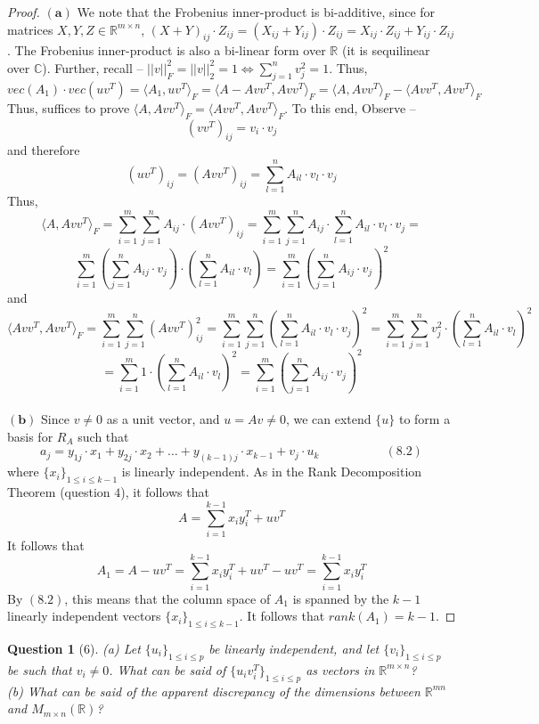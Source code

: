\documentclass[11pt]{article}
\theoremstyle{quest}
\newtheorem*{question}{Question}
\begin{document}
\begin{proof}
$\mathbf{(a)}$ We note that the Frobenius inner-product is bi-additive, since for matrices $X, Y, Z \in \mathbb{R}^{m \times n}$, $(X+Y)_{ij} \cdot Z_{ij} = (X_{ij} + Y_{ij}) \cdot Z_{ij} = X_{ij} \cdot Z_{ij} + Y_{ij} \cdot Z_{ij}$. The Frobenius inner-product is also a bi-linear form over $\mathbb{R}$ (it is sequilinear over $\mathbb{C}$). Further, recall -- $||v||_F^2 = ||v||_2^2 = 1 \iff \sum_{j=1}^n v_j^2 = 1$. Thus,
$$vec(A_1) \cdot vec(uv^T) = \langle A_1, uv^T \rangle_F = \langle A - Avv^T, Avv^T \rangle_F = \langle A, Avv^T \rangle_F - \langle Avv^T, Avv^T \rangle_F$$
Thus, suffices to prove $ \langle A, Avv^T \rangle_F = \langle Avv^T, Avv^T \rangle_F$. To this end, Observe --
$$(vv^T)_{ij} = v_i \cdot v_j$$
and therefore
$$(uv^T)_{ij} = (Avv^T)_{ij} = \sum_{l=1}^n A_{il} \cdot v_l \cdot v_j$$
Thus,
$$\langle A, Avv^T \rangle_F = \sum_{i =1}^m \sum_{j=1}^n A_{ij} \cdot (Avv^T)_{ij} = \sum_{i =1}^m \sum_{j=1}^n A_{ij} \cdot \sum_{l=1}^n A_{il} \cdot v_l \cdot v_j =$$ $$\sum_{i =1}^m (\sum_{j=1}^n A_{ij} \cdot v_j) \cdot (\sum_{l=1}^n A_{il} \cdot v_l) = \sum_{i =1}^m (\sum_{j=1}^n A_{ij} \cdot v_j)^2$$
and
$$\langle Avv^T, Avv^T \rangle_F = \sum_{i =1}^m \sum_{j =1}^n (Avv^T)_{ij}^2 = \sum_{i =1}^m \sum_{j =1}^n (\sum_{l=1}^n A_{il} \cdot v_l \cdot v_j)^2 = \sum_{i =1}^m \sum_{j =1}^n v_j^2 \cdot (\sum_{l=1}^n A_{il} \cdot v_l)^2$$
$$= \sum_{i =1}^m 1 \cdot (\sum_{l=1}^n A_{il} \cdot v_l)^2 = \sum_{i =1}^m (\sum_{j=1}^n A_{ij} \cdot v_j)^2$$
\\$\mathbf{(b)}$ Since $v \ne 0$ as a unit vector, and $u = Av \ne 0$, we can extend $\{u\}$ to form a basis for $R_A$ such that
$$a_j = y_{1j} \cdot x_1 + y_{2j} \cdot x_2 + \ldots + y_{(k-1)j} \cdot x_{k-1} + v_j \cdot u_k\ \ \ \ \ \ \ \ \ \ \ \ \ \ \ \ \ \ \ \ \ \ \ \ (8.2)$$
where $\{x_i\}_{1 \le i \le k-1}$ is linearly independent. As in the Rank Decomposition Theorem (question $4$), it follows that
$$A = \sum_{i=1}^{k-1} x_i y_i^T + uv^T$$
It follows that
$$A_1 = A - uv^T = \sum_{i=1}^{k-1} x_i y_i^T + uv^T - uv^T = \sum_{i=1}^{k-1} x_i y_i^T$$
By $(8.2)$, this means that the column space of $A_1$ is spanned by the $k-1$ linearly independent vectors $\{x_i\}_{1 \le i \le k-1}$. It follows that $rank(A_1) = k-1$.
\end{proof}
\begin{question}[6]
(a) Let $\{u_i\}_{1 \le i \le p}$ be linearly independent, and let $\{v_i\}_{1 \le i \le p}$ be such that $v_i \ne 0$. What can be said of $\{u_iv_i^T\}_{1 \le i \le p}$ as vectors in $\mathbb{R}^{m \times n}$?
\\(b) What can be said of the apparent discrepancy of the dimensions between $\mathbb{R}^{m n}$ and $M_{m \times n}(\mathbb{R})$?
\end{question}
\end{document}
